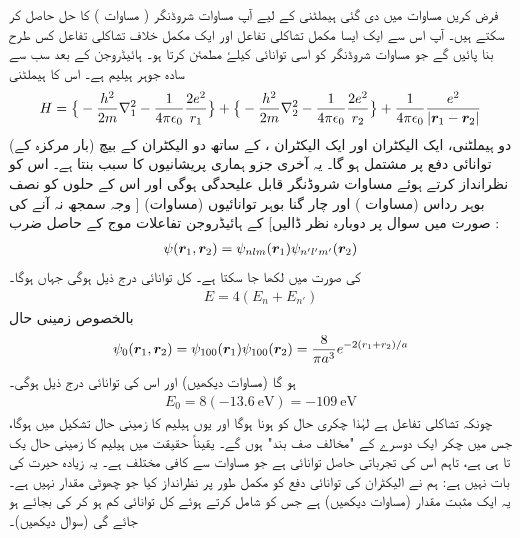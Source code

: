 فرض کریں مساوات    میں دی گئی ہیملٹنی کے لیے آپ مساوات شروڈنگر (  مساوات  )    کا 
حل  حاصل کر  سکتے ہیں۔ آپ اس سے ایک ایسا مکمل تشاکلی تفاعل اور  ایک مکمل خلاف تشاکلی تفاعل کس طرح بنا پائیں گے جو مساوات شروڈنگر کو اسی توانائی کیلۓ مطمئن کرتا ہو۔
ہائیڈروجن کے بعد سب سے  سادہ جوہر ہیلیم  ہے۔ اس کا ہیملٹنی
\begin{align}\label{مساوات_متماثل_ہیلیم_ہیملٹنی}
H= \big\{ -\frac{h^2}{2m}\nabla^2 _{1} -\frac{1}{4\pi\epsilon_{0}} \frac{2e^2}{r_{1}}\big\} +
 \big\{ -\frac{h^2}{2m} \nabla^2 _{2}-\frac{1}{4 \pi \epsilon_{0}} \frac{2e^2}{r_{2}}\big\}+ \frac{1}{4 \pi \epsilon_{0}}\frac{e^2}{|{{\boldsymbol{r}}}_{1} -{{\boldsymbol{r}}}_{2}|}
\end{align}
(بار   مرکزہ کے)  دو     ہیملٹنی، ایک  الیکٹران اور ایک  الیکٹران ،  کے ساتھ دو الیکٹران کے بیچ توانائی دفع پر مشتمل ہو گا۔ یہ آخری جزو ہماری پریشانیوں کا سبب بنتا ہے۔ اس کو نظرانداز کرتے ہوئے مساوات  شروڈنگر قابل علیحدگی ہوگی   اور اس کے حلوں کو نصف بوہر رداس (مساوات )   اور چار گنا بوہر توانائیوں (مساوات) [  وجہ   سمجھ نہ آنے    کی صورت میں سوال  پر دوبارہ نظر ڈالیں] کے  ہائیڈروجن تفاعلات موج کے حاصل ضرب :
\begin{align}
 \psi({{\boldsymbol{r}}}_{1}, {{\boldsymbol{r}}}_{2})= \psi_{nlm} ({{\boldsymbol{r}}}_{1}) \psi_{n' l' m'} ({{\boldsymbol{r}}}_{2})
\end{align}
کی صورت میں لکھا جا سکتا ہے۔ کل توانائی درج ذیل ہوگی جہاں  ہوگا۔
\begin{align}
 E= 4(E_{n} +E_{n'})
 \end{align}
بالخصوص زمینی حال 
\begin{align}\label{مساوات_متماثل_ہیلیم_زمینی_حال}
\psi_{0}({{\boldsymbol{r}}}_{1}, {{\boldsymbol{r}}}_{2})=\psi_{100}({{\boldsymbol{r}}}_{1}) \psi_{100}({{\boldsymbol{r}}}_{2})=\frac{8}{\pi a^3}e^{-2(r_{1} + r_{2})/a}
\end{align}
ہو گا (مساوات    دیکھیں) اور اس کی توانائی درج ذیل ہوگی۔
\begin{align}\label{مساوات_متماثل_ہیلیم_توانائی_الف}
 E_{0}=8(\SI{-13.6}{\electronvolt})=\SI{-109}{\electronvolt}
 \end{align}
چونکہ  تشاکلی تفاعل ہے لہٰذا چکری  حال کو  ہونا ہوگا اور یوں ہیلیم کا  زمینی حال    تشکیل میں   ہوگا،  جس میں چکر ایک دوسرے کے "مخالف صف بند" ہوں گے۔ یقیناً حقیقت میں ہیلیم کا زمینی حال   یک تا  ہی ہے،  تاہم  اس کی تجرباتی  حاصل  توانائی   ہے  جو مساوات  سے کافی مختلف ہے۔ یہ زیادہ  حیرت کی بات نہیں ہے:  ہم نے الیکٹران کی توانائی دفع کو مکمل طور پر نظرانداز کیا جو چھوٹی مقدار نہیں ہے۔ یہ ایک مثبت مقدار   (مساوات   دیکھیں) ہے  جس کو شامل کرتے ہوئے کل توانائی کم  ہو کر       کی بجائے    ہو جائے گی  (سوال   دیکھیں)۔

